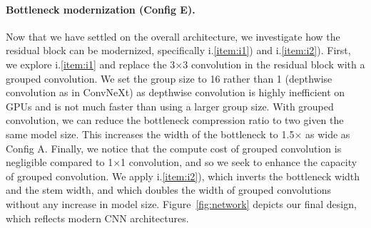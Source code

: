 \paragraph{Bottleneck modernization (Config E).}
Now that we have settled on the overall architecture, we investigate how the residual block can be modernized, specifically i.\ref{item:i1}) and i.\ref{item:i2}). First, we explore i.\ref{item:i1} and replace the 3$\times$3 convolution in the residual block with a grouped convolution. We set the group size to 16 rather than 1 (\ie depthwise convolution as in ConvNeXt) as depthwise convolution is highly inefficient on GPUs and is not much faster than using a larger group size. With grouped convolution, we can reduce the bottleneck compression ratio to two given the same model size. This increases the width of the bottleneck to 1.5$\times$ as wide as Config A. 
Finally, we notice that the compute cost of grouped convolution is negligible compared to 1$\times$1 convolution, and so we seek to enhance the capacity of grouped convolution. We apply i.\ref{item:i2}), which inverts the bottleneck width and the stem width, and which doubles the width of grouped convolutions without any increase in model size. Figure~\ref{fig:network} depicts our final design, which reflects modern CNN architectures.